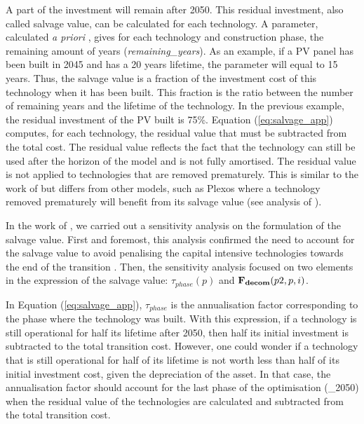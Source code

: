 A part of the investment will remain after 2050. This residual investment, also called salvage value, can be calculated for each technology. 
A parameter, calculated \textit{a priori} , gives for each technology and construction phase, the remaining amount of years (\emph{remaining\_years}). 
As an example, if a PV panel has been built in 2045 and has a 20 years lifetime, the parameter will equal to 15 years. 
Thus, the salvage value is a fraction of the investment cost of this technology when it has been built. 
This fraction is the ratio between the number of remaining years and the lifetime of the technology. 
In the previous example, the residual investment of the PV built is 75\%. 
Equation (\ref{eq:salvage_app}) computes, for each technology, the residual value that must be subtracted from the total cost. The residual value reflects the fact that the technology can still be used after the horizon of the model and is not fully amortised. The residual value is not applied to technologies that are removed prematurely. This is similar to the work of \citet{prina2019transition} but differs from other models, such as Plexos where a technology removed prematurely will benefit from its salvage value (see analysis of \cite{waucquez2023validation}).

In the work of \citet{goffauxpathway}, we carried out a sensitivity analysis on the formulation of the salvage value. First and foremost, this analysis confirmed the need to account for the salvage value to avoid penalising the capital intensive technologies towards the end of the transition \cite{poncelet2016myopic}. Then, the sensitivity analysis focused on two elements in the expression of the salvage value: $\tau_{phase}(p)$ and $\textbf{F\textsubscript{decom}}(p2,p,i)$. 

In Equation (\ref{eq:salvage_app}), $\tau_{phase}$ is the annualisation factor corresponding to the phase where the technology was built. With this expression, if a technology is still operational for half its lifetime after 2050, then half its initial investment is subtracted to the total transition cost. However, one could wonder if a technology that is still operational for half of its lifetime is not worth less than half of its initial investment cost, given the depreciation of the asset. In that case, the annualisation factor should account for the last phase of the optimisation (\_2050) when the residual value of the technologies are calculated and subtracted from the total transition cost. 

